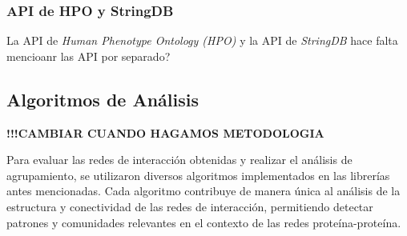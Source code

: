 \subsubsection{API de HPO y StringDB}
La API de \textit{Human Phenotype Ontology (HPO)} y la API de \textit{StringDB} hace falta mencioanr las API por separado?

\subsection{Algoritmos de Análisis}

\textbf{!!!CAMBIAR CUANDO HAGAMOS METODOLOGIA}

Para evaluar las redes de interacción obtenidas y realizar el análisis de agrupamiento, se utilizaron diversos algoritmos implementados en las librerías antes mencionadas. Cada algoritmo contribuye de manera única al análisis de la estructura y conectividad de las redes de interacción, permitiendo detectar patrones y comunidades relevantes en el contexto de las redes proteína-proteína.
\\

